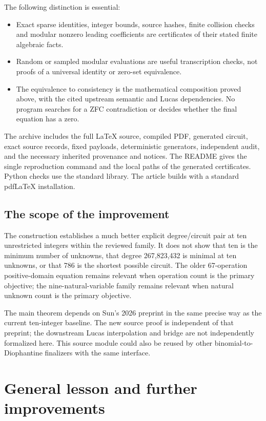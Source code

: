 \documentclass[11pt,letterpaper]{article}
\theoremstyle{definition}\newtheorem{definition}[theorem]{Definition}
\theoremstyle{remark}\newtheorem{remark}[theorem]{Remark}
\begin{document}
The following distinction is essential:
\begin{itemize}[leftmargin=1.5em]
\item Exact sparse identities, integer bounds, source hashes, finite collision checks and modular nonzero leading coefficients are certificates of their stated finite algebraic facts.
\item Random or sampled modular evaluations are useful transcription checks, not proofs of a universal identity or zero-set equivalence.
\item The equivalence to consistency is the mathematical composition proved above, with the cited upstream semantic and Lucas dependencies. No program searches for a ZFC contradiction or decides whether the final equation has a zero.
\end{itemize}

The archive includes the full LaTeX source, compiled PDF, generated circuit, exact source records, fixed payloads, deterministic generators, independent audit, and the necessary inherited provenance and notices. The README gives the single reproduction command and the local paths of the generated certificates. Python checks use the standard library. The article builds with a standard pdfLaTeX installation.

\subsection{The scope of the improvement}

The construction establishes a much better explicit degree/circuit pair at ten unrestricted integers within the reviewed family. It does not show that ten is the minimum number of unknowns, that degree 267,823,432 is minimal at ten unknowns, or that 786 is the shortest possible circuit. The older 67-operation positive-domain equation remains relevant when operation count is the primary objective; the nine-natural-variable family remains relevant when natural unknown count is the primary objective.

The main theorem depends on Sun's 2026 preprint in the same precise way as the current ten-integer baseline. The new source proof is independent of that preprint; the downstream Lucas interpolation and bridge are not independently formalized here. This source module could also be reused by other binomial-to-Diophantine finalizers with the same interface.

\section{General lesson and further improvements}\label{sec:general}
\end{document}
